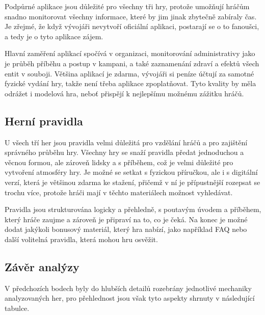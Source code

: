 Podpůrné aplikace jsou důležité pro všechny tři hry, protože umožňují hráčům snadno monitorovat všechny informace, které by jim jinak zbytečně zabíraly čas. Je zřejmé, že když vývojáři nevytvoří oficiální aplikaci, postarají se o to fanoušci, a tedy je o tyto aplikace zájem. 

Hlavní zaměření aplikací spočívá v organizaci, monitorování administrativy jako je průběh příběhu a postup v kampani, a také zaznamenání zdraví a efektů všech entit v souboji. Většina aplikací je zdarma, vývojáři si peníze účtují za samotné fyzické vydání hry, takže není třeba aplikace zpoplatňovat. Tyto kvality by měla odrážet i modelová hra, neboť přispějí k nejlepšímu možnému zážitku hráčů.

\subsection{Herní pravidla}
\label{subsec:comparison_rules}

U všech tří her jsou pravidla velmi důležitá pro vzdělání hráčů a pro zajištění správného průběhu hry. Všechny hry se snaží pravidla předat jednoduchou a věcnou formou, ale zároveň lidsky a s příběhem, což je velmi důležité pro vytvoření atmosféry hry. Je možné se setkat s fyzickou příručkou, ale i s digitální verzí, která je většinou zdarma ke stažení, přičemž v ní je přípustnější rozepsat se trochu více, protože hráči mají v těchto materiálech možnost vyhledávat.

Pravidla jsou strukturována logicky a přehledně, s poutavým úvodem a příběhem, který hráče zaujme a zároveň je připraví na to, co je čeká. Na konec je možné dodat jakýkoli bonusový materiál, který hra nabízí, jako například FAQ nebo další volitelná pravidla, která mohou hru osvěžit.

\subsection{Závěr analýzy}
\label{subsec:comparison_conclusion}

V předchozích bodech byly do hlubších detailů rozebrány jednotlivé mechaniky analyzovaných her, pro přehlednost jsou však tyto aspekty shrnuty v následující tabulce.

